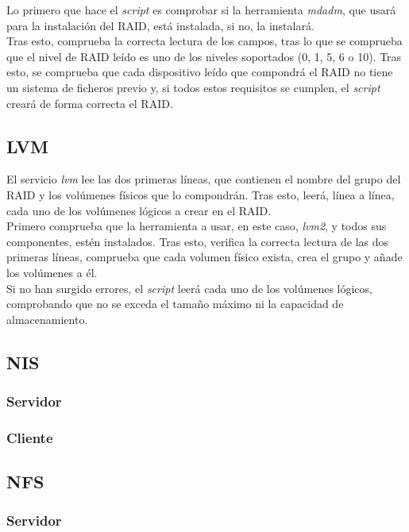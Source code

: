 \documentclass[12pt,a4paper, spanish]{article}
\begin{document}
Lo primero que hace el \textit{script} es comprobar si la herramienta \textit{mdadm}, que usará para la instalación del RAID, está instalada, si no, la instalará.\\

Tras esto, comprueba la correcta lectura de los campos, tras lo que se comprueba que el nivel de RAID leído es uno de los niveles soportados (0, 1, 5, 6 o 10). Tras esto, se comprueba que cada dispositivo leído que compondrá el RAID no tiene un sistema de ficheros previo y, si todos estos requisitos se cumplen, el \textit{script} creará de forma correcta el RAID.\\


\newpage
\subsection{LVM}
\noindent El servicio \textit{lvm} lee las dos primeras líneas, que contienen el nombre del grupo del RAID y los volúmenes físicos que lo compondrán. Tras esto, leerá, línea a línea, cada uno de los volúmenes lógicos a crear en el RAID.\\

Primero comprueba que la herramienta a usar, en este caso, \textit{lvm2}, y todos sus componentes, estén instalados. Tras esto, verifica la correcta lectura de las dos primeras líneas, comprueba que cada volumen físico exista, crea el grupo y añade los volúmenes a él.\\

Si no han surgido errores, el \textit{script} leerá cada uno de los volúmenes lógicos, comprobando que no se exceda el tamaño máximo ni la capacidad de almacenamiento.


\subsection{NIS}
\subsubsection{Servidor}
\subsubsection{Cliente}

\subsection{NFS}
\subsubsection{Servidor}
\end{document}
